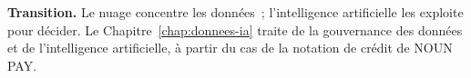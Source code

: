\bigskip

\begin{boxinfo}
\textbf{Transition.} Le nuage concentre les données~; l'intelligence
artificielle les exploite pour décider. Le Chapitre~\ref{chap:donnees-ia}
traite de la gouvernance des données et de l'intelligence artificielle, à
partir du cas de la notation de crédit de NOUN PAY.
\end{boxinfo}
